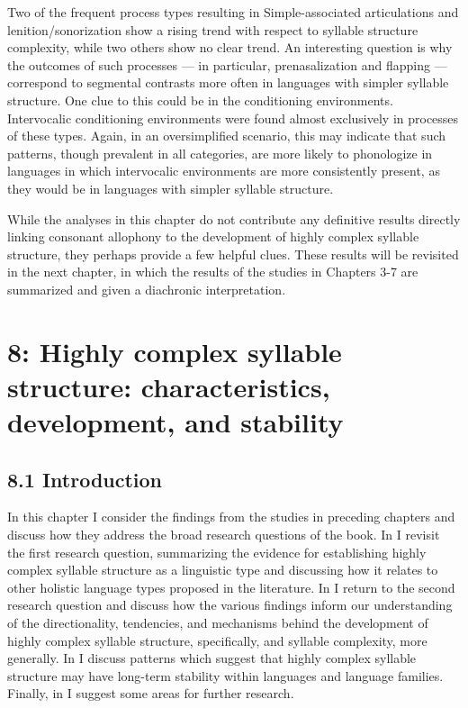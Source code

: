   Two of the frequent process types resulting in Simple-associated articulations and lenition/sonorization show a rising trend with respect to syllable structure complexity, while two others show no clear trend. An interesting question is why the outcomes of such processes — in particular, prenasalization and flapping — correspond to segmental contrasts more often in languages with simpler syllable structure. One clue to this could be in the conditioning environments. Intervocalic conditioning environments were found almost exclusively in processes of these types. Again, in an oversimplified scenario, this may indicate that such patterns, though prevalent in all categories, are more likely to phonologize in languages in which intervocalic environments are more consistently present, as they would be in languages with simpler syllable structure.



  While the analyses in this chapter do not contribute any definitive results directly linking consonant allophony to the development of highly complex syllable structure, they perhaps provide a few helpful clues. These results will be revisited in the next chapter, in which the results of the studies in Chapters 3-7 are summarized and given a diachronic interpretation.


\chapter{8: Highly complex syllable structure: characteristics, development, and stability}
\section{8.1 Introduction}

  In this chapter I consider the findings from the studies in preceding chapters and discuss how they address the broad research questions of the book. In  I revisit the first research question, summarizing the evidence for establishing highly complex syllable structure as a linguistic type and discussing how it relates to other holistic language types proposed in the literature. In  I return to the second research question and discuss how the various findings inform our understanding of the directionality, tendencies, and mechanisms behind the development of highly complex syllable structure, specifically, and syllable complexity, more generally. In  I discuss patterns which suggest that highly complex syllable structure may have long-term stability within languages and language families. Finally, in  I suggest some areas for further research.



